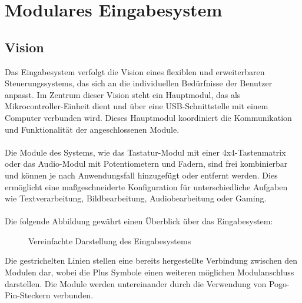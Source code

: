 \chapter{Modulares Eingabesystem}
\section{Vision}
Das Eingabesystem verfolgt die Vision eines flexiblen und erweiterbaren Steuerungssystems, das sich an die individuellen Bedürfnisse der Benutzer anpasst. Im Zentrum dieser Vision steht ein Hauptmodul, das als Mikrocontroller-Einheit dient und über eine USB-Schnittstelle mit einem Computer verbunden wird. Dieses Hauptmodul koordiniert die Kommunikation und Funktionalität der angeschlossenen Module.
\\
\\
Die Module des Systems, wie das Tastatur-Modul mit einer 4x4-Tastenmatrix oder das Audio-Modul mit Potentiometern und Fadern, sind frei kombinierbar und können je nach Anwendungsfall hinzugefügt oder entfernt werden. Dies ermöglicht eine maßgeschneiderte Konfiguration für unterschiedliche Aufgaben wie Textverarbeitung, Bildbearbeitung, Audiobearbeitung oder Gaming.
\\
\\
Die folgende Abbildung gewährt einen Überblick über das Eingabesystem:
\begin{figure}[H]
    \centering    
    \caption{Vereinfachte Darstellung des Eingabesystems}
    \label{A3TPHP}
\end{figure}
\noindent Die gestrichelten Linien stellen eine bereits hergestellte Verbindung zwischen den Modulen dar, wobei die \glqq Plus\grqq{} Symbole einen weiteren möglichen Modulanschluss darstellen. Die Module werden untereinander durch die Verwendung von Pogo-Pin-Steckern verbunden.
